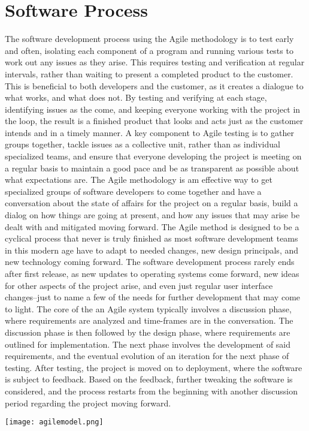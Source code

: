 \documentclass[conference]{IEEEtran}
\begin{document}
\section{Software Process}
The software development process using the Agile methodology is to test early and often, isolating each component of a program and running various tests to work out any issues as they arise.  This requires testing and verification at regular intervals, rather than waiting to present a completed product to the customer.  This is beneficial to both developers and the customer, as it creates a dialogue to what works, and what does not.  By testing and verifying at each stage, identifying issues as the come, and keeping everyone working with the project in the loop, the result is a finished product that looks and acts just as the customer intends and in a timely manner.  A key component to Agile testing is to gather groups together, tackle issues as a collective unit, rather than as individual specialized teams, and ensure that everyone developing the project is meeting on a regular basis to maintain a good pace and be as transparent as possible about what expectations are.  The Agile methodology is am effective way to get specialized groups of software developers to come together and have a conversation about the state of affairs for the project on a regular basis, build a dialog on how things are going at present, and how any issues that may arise be dealt with and mitigated moving forward.  The Agile method is designed to be a cyclical process that never is truly finished as most software development teams in this modern age have to adapt to needed changes, new design principals, and new technology coming forward.  The software development process rarely ends after first release, as new updates to operating systems come forward, new ideas for other aspects of the project arise, and even just regular user interface changes--just to name a few of the needs for further development that may come to light.  The core of the an Agile system typically involves a discussion phase, where requirements are analyzed and time-frames are in the conversation.  The discussion phase is then followed by the design phase, where requirements are outlined for implementation.  The next phase involves the development of said requirements, and the eventual evolution of an iteration for the next phase of testing.  After testing, the project is moved on to deployment, where the software is subject to feedback.  Based on the feedback, further tweaking the software is considered, and the process restarts from the beginning with another discussion period regarding the project moving forward. 
\begin{center}
\texttt{[image: agilemodel.png]}\\
\cite{SCRUM}
\end{center}
\end{document}
